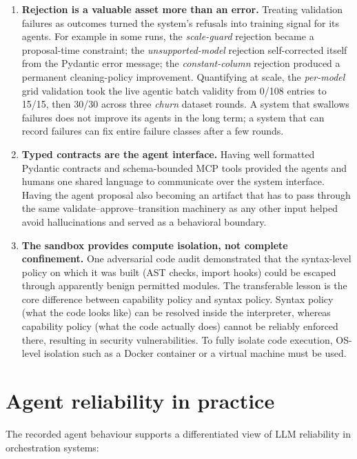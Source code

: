 \begin{enumerate}
	\item \textbf{Rejection is a valuable asset more than an error.} Treating validation failures as outcomes turned the system's refusals into training signal for its agents. For example in some runs, the \emph{scale-guard} rejection became a proposal-time constraint; the 	\emph{unsupported-model} rejection self-corrected itself from the Pydantic error message; the \emph{constant-column} rejection produced a permanent cleaning-policy improvement. Quantifying at scale, the
	\emph{per-model} grid validation took the live agentic batch validity from 0/108 entries to 15/15, then 30/30 across three \emph{churn} dataset rounds. A system that swallows failures does not improve its agents in the long term; a system that can record failures can fix entire failure classes after a few rounds.

	\item \textbf{Typed contracts are the agent interface.} Having well formatted Pydantic contracts and schema-bounded MCP tools provided the agents and humans one shared language to communicate over the system interface. Having the agent proposal also becoming an artifact that has to pass through the same validate--approve--transition machinery as any other input helped avoid hallucinations and served as a behavioral boundary.

	\item \textbf{The sandbox provides compute isolation, not complete confinement.} One adversarial code audit demonstrated that the syntax-level policy on which it was built (AST checks, import hooks) could be escaped through apparently benign permitted modules. The transferable lesson is the core difference between capability policy and syntax policy. Syntax policy (what the code looks like) can be resolved inside the interpreter, whereas capability policy (what the code actually does) cannot be reliably enforced there, resulting in security vulnerabilities. To fully isolate code execution, OS-level isolation such as a Docker container or a virtual machine must be used.

\end{enumerate}

\section{Agent reliability in practice}
\label{sec:agentreliability}

The recorded agent behaviour supports a differentiated view of LLM reliability in orchestration systems:

